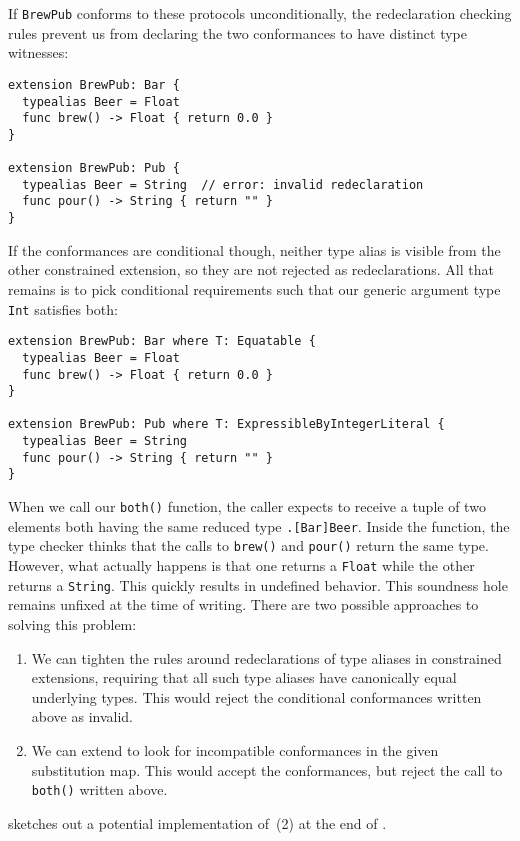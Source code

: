 \documentclass[../generics]{subfiles}
\begin{document}
If \texttt{BrewPub} conforms to these protocols unconditionally, the redeclaration checking rules prevent us from declaring the two conformances to have distinct type witnesses:
\begin{Verbatim}
extension BrewPub: Bar {
  typealias Beer = Float
  func brew() -> Float { return 0.0 }
}

extension BrewPub: Pub {
  typealias Beer = String  // error: invalid redeclaration
  func pour() -> String { return "" }
}
\end{Verbatim}
If the conformances are conditional though, neither type alias is visible from the other constrained extension, so they are not rejected as redeclarations. All that remains is to pick conditional requirements such that our generic argument type \texttt{Int} satisfies both:
\begin{Verbatim}
extension BrewPub: Bar where T: Equatable {
  typealias Beer = Float
  func brew() -> Float { return 0.0 }
}

extension BrewPub: Pub where T: ExpressibleByIntegerLiteral {
  typealias Beer = String
  func pour() -> String { return "" }
}
\end{Verbatim}
When we call our \texttt{both()} function, the caller expects to receive a tuple of two elements both having the same reduced type \texttt{\rT.[Bar]Beer}. Inside the function, the type checker thinks that the calls to \texttt{brew()} and \texttt{pour()} return the same type. However, what actually happens is that one returns a \texttt{Float} while the other returns a \texttt{String}. This quickly results in undefined behavior. This soundness hole remains unfixed at the time of writing. There are two possible approaches to solving this problem:
\begin{enumerate}
\item We can tighten the rules around redeclarations of type aliases in constrained extensions, requiring that all such type aliases have canonically equal underlying types. This would reject the conditional conformances written above as invalid.
\item We can extend  to look for incompatible conformances in the given substitution map. This would accept the conformances, but reject the call to \texttt{both()} written above.
\end{enumerate}
 sketches out a potential implementation of~(2) at the end of .
\end{document}

